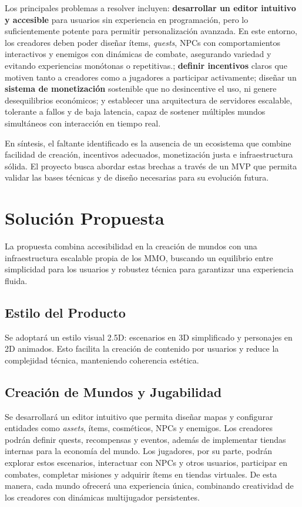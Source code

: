 Los principales problemas a resolver incluyen: \textbf{desarrollar un editor intuitivo y accesible} para usuarios sin experiencia en programación, 
pero lo suficientemente potente para permitir personalización avanzada. En este entorno, los creadores deben poder diseñar ítems, \textit{quests},
NPCs con comportamientos interactivos y enemigos con dinámicas de combate, asegurando variedad y evitando experiencias 
monótonas o repetitivas.; \textbf{definir incentivos} claros que motiven tanto a creadores como a jugadores a participar activamente; 
diseñar un \textbf{sistema de monetización} sostenible que no desincentive el uso, ni genere desequilibrios económicos; 
y establecer una arquitectura de servidores escalable, tolerante a fallos y de baja latencia, capaz de sostener múltiples mundos simultáneos con interacción en tiempo real.  
\vspace{0.25cm}

En síntesis, el faltante identificado es la ausencia de un ecosistema que combine facilidad de creación, incentivos adecuados, monetización justa e infraestructura sólida. 
El proyecto busca abordar estas brechas a través de un MVP que permita validar las bases técnicas y de diseño necesarias para su evolución futura.

\section{Solución Propuesta}

La propuesta combina accesibilidad en la creación de mundos con una infraestructura escalable propia de los MMO, 
buscando un equilibrio entre simplicidad para los usuarios y robustez técnica para garantizar una experiencia fluida.

\subsection{Estilo del Producto}
Se adoptará un estilo visual 2.5D: escenarios en 3D simplificado y personajes en 2D animados. 
Esto facilita la creación de contenido por usuarios y reduce la complejidad técnica, manteniendo coherencia estética.

\subsection{Creación de Mundos y Jugabilidad}
Se desarrollará un editor intuitivo que permita diseñar mapas y configurar entidades como \textit{assets}, ítems, cosméticos, NPCs y enemigos.  
Los creadores podrán definir quests, recompensas y eventos, además de implementar tiendas internas para la economía del mundo.  
Los jugadores, por su parte, podrán explorar estos escenarios, interactuar con NPCs y otros usuarios, participar en combates, completar misiones 
y adquirir ítems en tiendas virtuales.  
De esta manera, cada mundo ofrecerá una experiencia única, combinando creatividad de los creadores con dinámicas multijugador persistentes.

